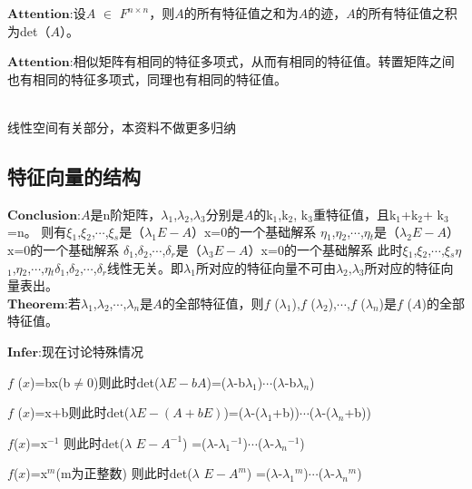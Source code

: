 \documentclass[lang=cn,10pt]{elegantbook}
\begin{document}
$\mathbf{Attention}$:设$\mathit{A}$ $\in$ $\mathit{F^{n\times n} }$，则$\mathit{A}$的所有特征值之和为$\mathit{A}$的迹，$\mathit{A}$的所有特征值之积为det（$\mathit{A}$）。

$\mathbf{Attention}$:相似矩阵有相同的特征多项式，从而有相同的特征值。转置矩阵之间也有相同的特征多项式，同理也有相同的特征值。



~\\

线性空间有关部分，本资料不做更多归纳

\subsection{特征向量的结构}
$\mathbf{Conclusion}$:$\mathit{A}$是n阶矩阵，$\lambda$$_{1}$,$\lambda$$_{2}$,$\lambda$$_{3}$分别是$\mathit{A}$的k$_{1}$,k$_{2}$,
k$_{3}$重特征值，且k$_{1}$+k$_{2}$+
k$_{3}$=n。
则有$\xi $$_{1}$,$\xi $$_{2}$,$\cdots$,$\xi $$_{s}$是（$\lambda$$_{1}$$\mathit{E-A}$）x=0的一个基础解系
$\eta  $$_{1}$,$\eta  $$_{2}$,$\cdots$,$\eta  $$_{t}$是（$\lambda$$_{2}$$\mathit{E-A}$）x=0的一个基础解系
$\delta  $$_{1}$,$\delta   $$_{2}$,$\cdots$,$\delta   $$_{r}$是（$\lambda$$_{3}$$\mathit{E-A}$）x=0的一个基础解系
此时$\xi $$_{1}$,$\xi $$_{2}$,$\cdots$,$\xi $$_{s}$$\eta  $$_{1}$,$\eta  $$_{2}$,$\cdots$,$\eta  $$_{t}$$\delta  $$_{1}$,$\delta   $$_{2}$,$\cdots$,$\delta   $$_{r}$线性无关。即$\lambda$$_{1}$所对应的特征向量不可由$\lambda$$_{2}$,$\lambda$$_{3}$所对应的特征向量表出。~\\

$\mathbf{Theorem}$:若$\lambda$$_{1}$,$\lambda$$_{2}$,$\cdots$,$\lambda$$_{n}$是$\mathit{A}$的全部特征值，则$\mathit{f}$ ($\lambda$$_{1}$),$\mathit{f}$ ($\lambda$$_{2}$),$\cdots$,$\mathit{f}$ ($\lambda$$_{n}$)是$\mathit{f}$ ($\mathit{A}$)的全部特征值。

$\mathbf{Infer}$:现在讨论特殊情况

$\mathit{f}$ ($\mathit{x}$)=bx(b$\ne $0)则此时det($\lambda$$\mathit{E-bA}$)=($\lambda$-b$\lambda$$_{1}$)$\cdots$($\lambda$-b$\lambda$$_{n}$)

$\mathit{f}$ ($\mathit{x}$)=x+b则此时det($\lambda$$\mathit{E-(A+bE)}$)=($\lambda$-($\lambda$$_{1}$+b))$\cdots$($\lambda$-($\lambda$$_{n}$+b))

$\mathit{f}$($\mathit{x}$)=x$^{-1}$
则此时det($\lambda$ $\mathit{E-A^{-1}}$)
=($\lambda$-$\lambda$$_{1}$$^{-1}$)$\cdots$($\lambda$-$\lambda$$_{n}$$^{-1}$)

$\mathit{f}$($\mathit{x}$)=x$^{m}$(m为正整数)
则此时det($\lambda$ $\mathit{E-A^{m}}$)
=($\lambda$-$\lambda$$_{1}$$^{m}$)$\cdots$($\lambda$-$\lambda$$_{n}$$^{m}$)
\end{document}
